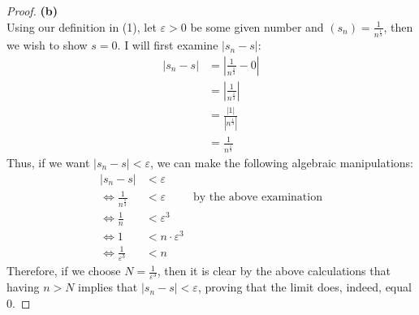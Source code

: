 \documentclass[10pt,a4paper]{article}
\theoremstyle{definition}
\begin{document}
\begin{proof}{\textbf{(b)}}
\\Using our definition in (1), let $\varepsilon > 0$ be some given number and $\displaystyle (s_n) = \frac{1}{n^{\frac{1}{3}}}$, then we wish to show $s = 0$. I will first examine $|s_n - s|$:
\begin{align*}
|s_n - s| &= \left|\frac{1}{n^{\frac{1}{3}}} - 0\right|\\
&= \left|\frac{1}{n^{\frac{1}{3}}}\right|\\
&= \frac{|1|}{|n^{\frac{1}{3}}|}\\
&= \frac{1}{n^{\frac{1}{3}}}
\end{align*}
Thus, if we want $|s_n - s| < \varepsilon$, we can make the following algebraic manipulations:
\begin{align*}
|s_n - s| &< \varepsilon\\
\iff \frac{1}{n^{\frac{1}{3}}} &< \varepsilon &\text{by the above examination}\\
\iff \frac{1}{n} &< \varepsilon^3\\
\iff 1 &< n\cdot \varepsilon^3\\
\iff \frac{1}{\varepsilon^3} &< n
\end{align*}
Therefore, if we choose $\displaystyle N = \frac{1}{\varepsilon^3}$, then it is clear by the above calculations that having $n > N$ implies that $|s_n - s| < \varepsilon$, proving that the limit does, indeed, equal $0$.
\end{proof}
\end{document}
